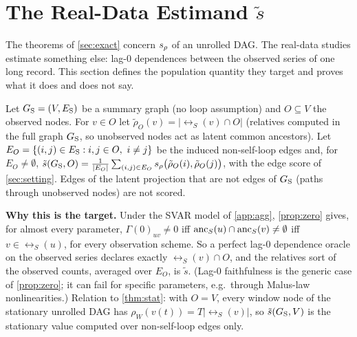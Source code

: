 \section{The Real-Data Estimand $\tilde s$}
\label{app:estimand}

The theorems of \cref{sec:exact} concern $s_\rho$ of an unrolled DAG. The
real-data studies estimate something else: lag-0 dependences between the
observed series of one long record. This section defines the population
quantity they target and proves what it does and does not say.

\begin{definition}[estimand]\label{def:estimand}
Let $G_{\mathrm S}=(V,E_{\mathrm S})$ be a summary graph (no loop assumption) and $O\subseteq V$
the observed nodes. For $v\in O$ let $\tilde\rho_O(v)=|\rel_S(v)\cap O|$
(relatives computed in the full graph $G_{\mathrm S}$, so unobserved nodes act as latent
common ancestors). Let $E_O=\{(i,j)\in E_{\mathrm S}:i,j\in O,\ i\ne j\}$ be the induced
non-self-loop edges and, for $E_O\neq\emptyset$,
$\tilde s(G_{\mathrm S},O)=\frac1{|E_O|}\sum_{(i,j)\in E_O}s_\rho\big(\tilde\rho_O(i),\tilde\rho_O(j)\big)$,
with the edge score of \cref{sec:setting}. Edges of the latent projection
that are not edges of $G_{\mathrm S}$ (paths through unobserved nodes) are not scored.
\end{definition}

\textbf{Why this is the target.} Under the SVAR model of \cref{app:agg},
\cref{prop:zero} gives, for almost every parameter, $\Gamma(0)_{uv}\ne0$ iff
$\mathrm{anc}_S(u)\cap\mathrm{anc}_S(v)\ne\emptyset$ iff $v\in\rel_S(u)$, for every
observation scheme. So a perfect lag-0 dependence oracle on the observed
series declares exactly $\rel_S(v)\cap O$, and the relatives sort of the
observed counts, averaged over $E_O$, is $\tilde s$. (Lag-0 faithfulness is the
generic case of \cref{prop:zero}; it can fail for specific parameters,
e.g.\ through Malus-law nonlinearities.) Relation to \cref{thm:stat}: with
$O=V$, every window node of the stationary unrolled DAG has
$\rho_W(v(t))=T|\rel_S(v)|$, so $\tilde s(G_{\mathrm S},V)$ is the stationary value
computed over non-self-loop edges only.

